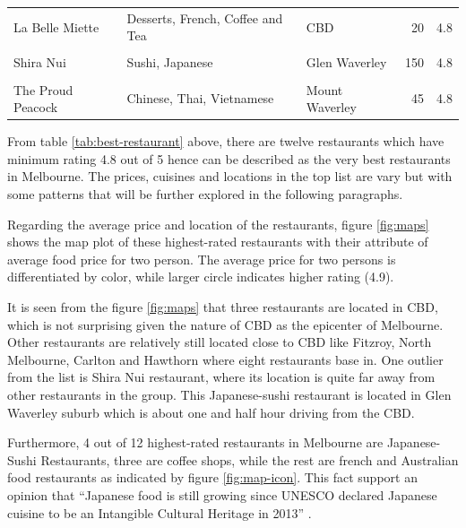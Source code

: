 \documentclass[11pt,a4paper,]{article}
\begin{document}
\begin{table}[!h]
\begin{tabular}[t]{l|l|l|r|r}
\hline
\cellcolor{pink}{Aka Siro} & \cellcolor{pink}{Japanese} & \cellcolor{pink}{Collingwood} & \cellcolor{pink}{80} & \cellcolor{pink}{4.8}\\
\hline
La Belle Miette & Desserts, French, Coffee and Tea & CBD & 20 & 4.8\\
\hline
\cellcolor{pink}{Attica} & \cellcolor{pink}{Australian, Contemporary} & \cellcolor{pink}{Ripponlea} & \cellcolor{pink}{600} & \cellcolor{pink}{4.8}\\
\hline
Shira Nui & Sushi, Japanese & Glen Waverley & 150 & 4.8\\
\hline
\cellcolor{pink}{Punch Lane} & \cellcolor{pink}{Mediterranean, Modern Australian} & \cellcolor{pink}{CBD} & \cellcolor{pink}{150} & \cellcolor{pink}{4.8}\\
\hline
The Proud Peacock & Chinese, Thai, Vietnamese & Mount Waverley & 45 & 4.8\\
\hline
\end{tabular}
\end{table}

From table \ref{tab:best-restaurant} above, there are twelve restaurants which have minimum rating 4.8 out of 5 hence can be described as the very best restaurants in Melbourne. The prices, cuisines and locations in the top list are vary but with some patterns that will be further explored in the following paragraphs.

Regarding the average price and location of the restaurants, figure \ref{fig:maps} shows the map plot of these highest-rated restaurants with their attribute of average food price for two person. The average price for two persons is differentiated by color, while larger circle indicates higher rating (4.9).

It is seen from the figure \ref{fig:maps} that three restaurants are located in CBD, which is not surprising given the nature of CBD as the epicenter of Melbourne. Other restaurants are relatively still located close to CBD like Fitzroy, North Melbourne, Carlton and Hawthorn where eight restaurants base in. One outlier from the list is Shira Nui restaurant, where its location is quite far away from other restaurants in the group. This Japanese-sushi restaurant is located in Glen Waverley suburb which is about one and half hour driving from the CBD.

Furthermore, 4 out of 12 highest-rated restaurants in Melbourne are Japanese-Sushi Restaurants, three are coffee shops, while the rest are french and Australian food restaurants as indicated by figure \ref{fig:map-icon}. This fact support an opinion that ``Japanese food is still growing since UNESCO declared Japanese cuisine to be an Intangible Cultural Heritage in 2013'' \textcite{sushi}.
\end{document}
